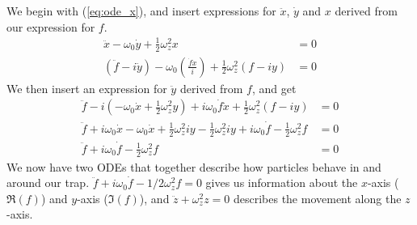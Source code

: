 %
We begin with (\ref{eq:ode_x}), and insert expressions for $\ddot x$, $\dot y$ and $x$ derived from our expression for $f$.
%
\begin{align*}
\ddot x - \omega_0 \dot y + \frac{1}{2} \omega_z^2 x &= 0 \\
\left( \ddot f - i \ddot y \right) - \omega_0 \left( \frac{\dot f \dot x}{i} \right) + \frac{1}{2} \omega_z^2 \left( f - iy \right) &= 0
\end{align*}
%
We then insert an expression for $\ddot y$ derived from $f$, and get
%
\begin{align*}
\ddot f - i \left( - \omega_0 \dot x + \frac{1}{2} \omega_z^2 y \right) + i \omega_0 \dot f \dot x + \frac{1}{2} \omega_z^2 \left( f - iy \right) &= 0 \\
\ddot f + i \omega_0 \dot x - \omega_0 \dot x + \frac{1}{2} \omega_z^2 i y - \frac{1}{2} \omega_z^2 i y + i \omega_0 \dot f - \frac{1}{2} \omega_z^2 f &= 0 \\
\ddot f + i \omega_0 \dot f - \frac{1}{2} \omega_z^2 f &= 0
\end{align*}
%
We now have two ODEs that together describe how particles behave in and around our trap. $\ddot f + i \omega_0 \dot f - 1/2 \omega_z^2 f = 0$ gives us information about the $x$-axis ($\Re(f)$) and $y$-axis ($\Im(f)$), and $\ddot z + \omega_z^2 z = 0$ describes the movement along the $z$-axis.

